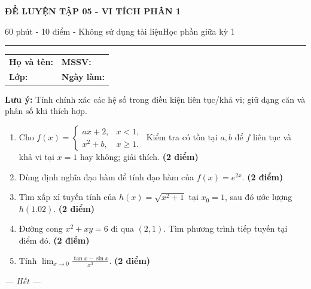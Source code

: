 \documentclass[11pt,a4paper]{article}
\newcommand{\examtitle}[4]{\begin{center}{\Large\bfseries\color{hcmusblue}#1}\par\vspace{3pt}{\large\bfseries #2}\par\vspace{3pt}\small #3\quad\textbullet\quad #4\end{center}\vspace{5pt}\hrule\vspace{8pt}}
\newcommand{\studentline}{\begin{tabularx}{\textwidth}{X X}\textbf{Họ và tên:} \hrulefill & \textbf{MSSV:} \hrulefill\\[7pt]\textbf{Lớp:} \hrulefill & \textbf{Ngày làm:} \hrulefill\end{tabularx}\vspace{8pt}}
\newcommand{\points}[1]{\hfill\textbf{(#1 điểm)}}
\begin{document}
\examtitle{ĐỀ LUYỆN TẬP 05 - VI TÍCH PHÂN 1}{VI TÍCH PHÂN 1 - HCMUS (bộ luyện tập)}{60 phút - 10 điểm - Không sử dụng tài liệu}{Học phần giữa kỳ 1}

\studentline
\begin{notebox}\textbf{Lưu ý:} Tính chính xác các hệ số trong điều kiện liên tục/khả vi; giữ dạng căn và phân số khi thích hợp.\end{notebox}
\begin{enumerate}
\item Cho $f(x)=\begin{cases}ax+2,&x<1,\\x^2+b,&x\ge1.\end{cases}$ Kiểm tra có tồn tại $a,b$ để $f$ liên tục và khả vi tại $x=1$ hay không; giải thích. \points{2}
\item Dùng định nghĩa đạo hàm để tính đạo hàm của $f(x)=e^{2x}$. \points{2}
\item Tìm xấp xỉ tuyến tính của $h(x)=\sqrt{x^2+1}$ tại $x_0=1$, sau đó ước lượng $h(1.02)$. \points{2}
\item Đường cong $x^2+xy=6$ đi qua $(2,1)$. Tìm phương trình tiếp tuyến tại điểm đó. \points{2}
\item Tính $\displaystyle\lim_{x\to0}\frac{\tan x-\sin x}{x^3}$. \points{2}
\end{enumerate}
\vfill\begin{center}\textit{--- Hết ---}\end{center}
\end{document}
